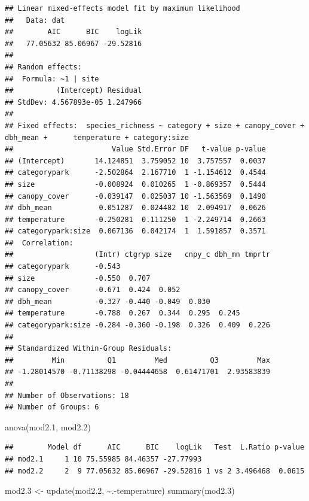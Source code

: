 \documentclass[
]{article}
\newenvironment{Shaded}{\begin{snugshade}}{\end{snugshade}}
\newcommand{\FloatTok}[1]{\textcolor[rgb]{0.00,0.00,0.81}{#1}}
\newcommand{\FunctionTok}[1]{\textcolor[rgb]{0.00,0.00,0.00}{#1}}
\newcommand{\NormalTok}[1]{#1}
\newcommand{\OtherTok}[1]{\textcolor[rgb]{0.56,0.35,0.01}{#1}}
\newcommand{\SpecialCharTok}[1]{\textcolor[rgb]{0.00,0.00,0.00}{#1}}
\begin{document}
\begin{verbatim}
## Linear mixed-effects model fit by maximum likelihood
##   Data: dat 
##        AIC      BIC    logLik
##   77.05632 85.06967 -29.52816
## 
## Random effects:
##  Formula: ~1 | site
##          (Intercept) Residual
## StdDev: 4.567893e-05 1.247966
## 
## Fixed effects:  species_richness ~ category + size + canopy_cover + dbh_mean +      temperature + category:size 
##                       Value Std.Error DF   t-value p-value
## (Intercept)       14.124851  3.759052 10  3.757557  0.0037
## categorypark      -2.502864  2.167710  1 -1.154612  0.4544
## size              -0.008924  0.010265  1 -0.869357  0.5444
## canopy_cover      -0.039147  0.025037 10 -1.563569  0.1490
## dbh_mean           0.051287  0.024482 10  2.094917  0.0626
## temperature       -0.250281  0.111250  1 -2.249714  0.2663
## categorypark:size  0.067136  0.042174  1  1.591857  0.3571
##  Correlation: 
##                   (Intr) ctgryp size   cnpy_c dbh_mn tmprtr
## categorypark      -0.543                                   
## size              -0.550  0.707                            
## canopy_cover      -0.671  0.424  0.052                     
## dbh_mean          -0.327 -0.440 -0.049  0.030              
## temperature       -0.788  0.267  0.344  0.295  0.245       
## categorypark:size -0.284 -0.360 -0.198  0.326  0.409  0.226
## 
## Standardized Within-Group Residuals:
##         Min          Q1         Med          Q3         Max 
## -1.28014570 -0.71138298 -0.04444658  0.61471701  2.93583839 
## 
## Number of Observations: 18
## Number of Groups: 6
\end{verbatim}

\begin{Shaded}
\begin{Highlighting}[]
\FunctionTok{anova}\NormalTok{(mod2}\FloatTok{.1}\NormalTok{, mod2}\FloatTok{.2}\NormalTok{)}
\end{Highlighting}
\end{Shaded}

\begin{verbatim}
##        Model df      AIC      BIC    logLik   Test  L.Ratio p-value
## mod2.1     1 10 75.55985 84.46357 -27.77993                        
## mod2.2     2  9 77.05632 85.06967 -29.52816 1 vs 2 3.496468  0.0615
\end{verbatim}

\begin{Shaded}
\begin{Highlighting}[]
\NormalTok{mod2}\FloatTok{.3} \OtherTok{\textless{}{-}} \FunctionTok{update}\NormalTok{(mod2}\FloatTok{.2}\NormalTok{, }\SpecialCharTok{\textasciitilde{}}\NormalTok{.}\SpecialCharTok{{-}}\NormalTok{temperature)}
\FunctionTok{summary}\NormalTok{(mod2}\FloatTok{.3}\NormalTok{)}
\end{Highlighting}
\end{Shaded}
\end{document}
